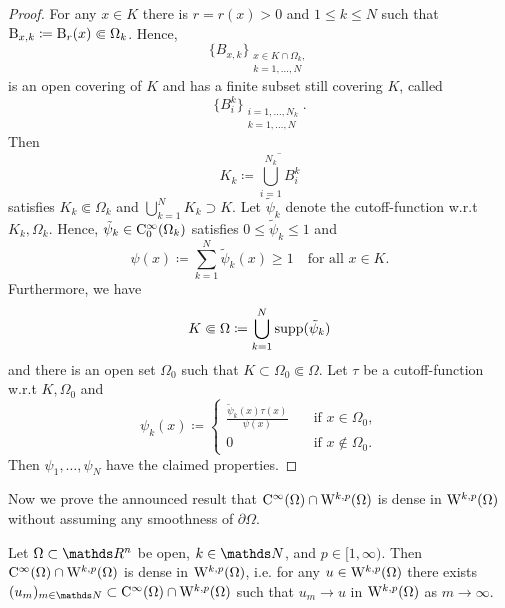 \begin{proof}
  For any $x \in K$ there is $r = r(x) > 0$ and $1\leq k \leq N$ such that $\mathrm{B}_{x, k} \coloneqq \mathrm{B}_r(x) \Subset \Omega_k$.
  Hence, $$\{B_{x,k}\}_{\substack{x \in K \cap \Omega_k, \\ k = 1,\dots,N}}$$ is an open covering of $K$ and has a finite subset still covering $K$, called $$\{B_i^k\}_{\substack{i = 1,\dots,N_k \\ k = 1,\dots,N}}.$$ Then
  $$
  K_k \coloneqq \overline{\bigcup_{i = 1}^{N_k} B_i^k}
  $$
  satisfies $K_k \Subset \Omega_k$ and $\bigcup_{k = 1}^N K_k \supset K$.
  Let $\tilde \psi_k$ denote the cutoff\hyp{}function w.r.t $K_k, \Omega_k$.
  Hence, $\tilde \psi_k \in \mathrm{C}_0^\infty(\Omega_k)$ satisfies $0 \leq \tilde \psi_k \leq 1$ and
  $$
  \psi(x) \coloneqq \sum_{k = 1}^N \tilde \psi_k(x) \geq 1 \quad\text{for all } x \in K.
  $$
  Furthermore, we have
  $$
  K \Subset \Omega \coloneqq \bigcup_{k = 1}^N \operatorname{supp}(\tilde \psi_k)
  $$
  and there is an open set $\Omega_0$ such that $K \subset \Omega_0 \Subset \Omega$.
  Let $\tau$ be a cutoff\hyp{}function w.r.t $K, \Omega_0$ and
  $$
  \psi_k(x) \coloneqq \begin{cases} \frac{\tilde \psi_k(x) \tau(x)}{\psi(x)} &\quad\text{if } x \in \Omega_0, \\ 0 &\quad \text{if } x \notin \Omega_0. \end{cases}
  $$
  Then $\psi_1,\dots,\psi_N$ have the claimed properties.
\end{proof}

Now we prove the announced result that $\mathrm{C}^\infty(\Omega) \cap \mathrm{W}^{k,p}(\Omega)$ is dense in $\mathrm{W}^{k,p}(\Omega)$ without assuming any smoothness of $\partial \Omega$.

\begin{thm}
  \label{thm:meyersSerrin}
  Let $\Omega \subset \R^n$ be open, $k \in \N$, and $p \in [1,\infty)$.
    Then $\mathrm{C}^\infty(\Omega) \cap \mathrm{W}^{k,p}(\Omega)$ is dense in $\mathrm{W}^{k,p}(\Omega)$, i.e. for any $u \in \mathrm{W}^{k,p}(\Omega)$ there exists $(u_m)_{m \in \N} \subset \CC^\infty(\Omega) \cap \WW^{k,p}(\Omega)$ such that $u_m \to u$ in $\mathrm{W}^{k,p}(\Omega)$ as $m \to \infty$.
\end{thm}

